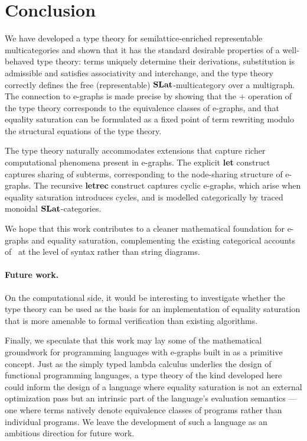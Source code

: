 \section{Conclusion}

We have developed a type theory for semilattice-enriched representable 
multicategories and shown that it has the standard desirable properties of a 
well-behaved type theory: terms uniquely determine their derivations, substitution 
is admissible and satisfies associativity and interchange, and the type theory 
correctly defines the free (representable) $\mathbf{SLat}$-multicategory over a 
multigraph.
The connection to e-graphs is made precise by showing that the $+$ operation of 
the type theory corresponds to the equivalence classes of e-graphs, and that 
equality saturation can be formulated as a fixed point of term rewriting modulo 
the structural equations of the type theory.

The type theory naturally accommodates extensions that capture richer 
computational phenomena present in e-graphs.
The explicit \textbf{let} construct captures sharing of subterms, corresponding 
to the node-sharing structure of e-graphs.
The recursive \textbf{letrec} construct captures cyclic e-graphs, which arise 
when equality saturation introduces cycles, and is modelled categorically by 
traced monoidal $\mathbf{SLat}$-categories.

We hope that this work contributes to a cleaner mathematical foundation for 
e-graphs and equality saturation, complementing the existing categorical accounts 
of~\citet{tiurin2025equivalencehypergraphsdporewriting} at the level of syntax 
rather than string diagrams.

\paragraph{Future work.}
On the computational side, it would be interesting to investigate whether the 
type theory can be used as the basis for an implementation of equality saturation 
that is more amenable to formal verification than existing algorithms.

Finally, we speculate that this work may lay some of the mathematical groundwork 
for programming languages with e-graphs built in as a primitive concept.
Just as the simply typed lambda calculus underlies the design of functional 
programming languages, a type theory of the kind developed here could inform the 
design of a language where equality saturation is not an external optimization 
pass but an intrinsic part of the language's evaluation semantics --- one where 
terms natively denote equivalence classes of programs rather than individual 
programs.
We leave the development of such a language as an ambitious direction for future 
work.